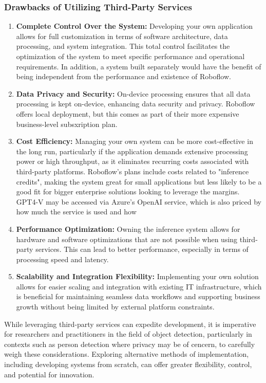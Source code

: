 \subsubsection{Drawbacks of Utilizing Third-Party Services}
\begin{enumerate}
    \item \textbf{Complete Control Over the System:} Developing your own application allows for full customization in terms of software architecture, data processing, and system integration. This total control facilitates the optimization of the system to meet specific performance and operational requirements. In addition, a system built separately would have the benefit of being independent from the performance and existence of Roboflow.
    \item \textbf{Data Privacy and Security:} On-device processing ensures that all data processing is kept on-device, enhancing data security and privacy. Roboflow offers local deployment, but this comes as part of their more expensive business-level subsxription plan.
    \item \textbf{Cost Efficiency:} Managing your own system can be more cost-effective in the long run, particularly if the application demands extensive processing power or high throughput, as it eliminates recurring costs associated with third-party platforms. Roboflow's plans include costs related to "inference credits", making the system great for small applications but less likely to be a good fit for bigger enterprise solutions looking to leverage the margins. GPT4-V may be accessed via Azure's OpenAI service, which is also priced by how much the service is used and how
    \item \textbf{Performance Optimization:} Owning the inference system allows for hardware and software optimizations that are not possible when using third-party services. This can lead to better performance, especially in terms of processing speed and latency.
    \item \textbf{Scalability and Integration Flexibility:} Implementing your own solution allows for easier scaling and integration with existing IT infrastructure, which is beneficial for maintaining seamless data workflows and supporting business growth without being limited by external platform constraints.
\end{enumerate}

While leveraging third-party services can expedite development, it is imperative for researchers and practitioners in the field of object detection, particularly in contexts such as person detection where privacy may be of cencern, to carefully weigh these considerations. Exploring alternative methods of implementation, including developing systems from scratch, can offer greater flexibility, control, and potential for innovation.

